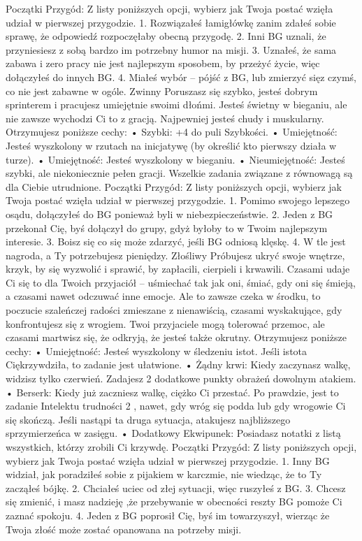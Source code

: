 Początki Przygód: Z listy poniższych opcji, wybierz jak Twoja postać wzięła udział w pierwszej przygodzie.
1. Rozwiązałeś łamigłówkę zanim zdałeś sobie sprawę, że odpowiedź rozpoczęłaby obecną przygodę.
2. Inni BG uznali, że przyniesiesz z sobą bardzo im potrzebny humor na misji.
3. Uznałeś, że sama zabawa i zero pracy nie jest najlepszym sposobem, by przeżyć życie, więc dołączyłeś do innych BG.
4. Miałeś wybór – pójść z BG, lub zmierzyć sięz czymś, co nie jest zabawne w ogóle. 
Zwinny
Poruszasz się szybko, jesteś dobrym sprinterem i pracujesz umiejętnie swoimi dłońmi. Jesteś świetny w bieganiu, ale nie zawsze wychodzi Ci to z gracją. Najpewniej jesteś chudy i muskularny.
Otrzymujesz poniższe cechy:
    • Szybki: +4 do puli Szybkości.
    • Umiejętność: Jesteś wyszkolony w rzutach na inicjatywę (by określić kto pierwszy działa w turze).
    • Umiejętność: Jesteś wyszkolony w bieganiu.
    • Nieumiejętność: Jesteś szybki, ale niekoniecznie pełen gracji. Wszelkie zadania związane z równowagą są dla Ciebie utrudnione. 
Początki Przygód: Z listy poniższych opcji, wybierz jak Twoja postać wzięła udział w pierwszej przygodzie.
1. Pomimo swojego lepszego osądu, dołączyłeś do BG ponieważ byli w niebezpieczeństwie. 
2. Jeden z BG przekonał Cię, byś dołączył do grupy, gdyż byłoby to w Twoim najlepszym interesie.
3. Boisz się co się może zdarzyć, jeśli BG odniosą klęskę.
4. W tle jest nagroda, a Ty potrzebujesz pieniędzy.
Złośliwy
Próbujesz ukryć swoje wnętrze, krzyk, by się wyzwolić i sprawić, by zapłacili, cierpieli i krwawili. Czasami udaje Ci się to dla Twoich przyjaciół – uśmiechać tak jak oni, śmiać, gdy oni się śmieją, a czasami nawet odczuwać inne emocje. Ale to zawsze czeka w środku, to poczucie szaleńczej radości zmieszane z nienawiścią, czasami wyskakujące, gdy konfrontujesz się z wrogiem. Twoi przyjaciele mogą tolerować przemoc, ale czasami martwisz się, że odkryją, że jesteś także okrutny.
Otrzymujesz poniższe cechy:
    • Umiejętność: Jesteś wyszkolony w śledzeniu istot. Jeśli istota Ciękrzywdziła, to zadanie jest ułatwione.
    • Żądny krwi: Kiedy zaczynasz walkę, widzisz tylko czerwień. Zadajesz 2 dodatkowe punkty obrażeń dowolnym atakiem. 
    • Berserk: Kiedy już zaczniesz walkę, ciężko Ci przestać. Po prawdzie, jest to zadanie Intelektu trudności 2 , nawet, gdy wróg się podda lub gdy wrogowie Ci się skończą. Jeśli nastąpi ta druga sytuacja, atakujesz najbliższego sprzymierzeńca w zasięgu.
    • Dodatkowy Ekwipunek: Posiadasz notatki z listą wszystkich, którzy zrobili Ci krzywdę.
Początki Przygód: Z listy poniższych opcji, wybierz jak Twoja postać wzięła udział w pierwszej przygodzie.
1. Inny BG widział, jak poradziłeś sobie z pijakiem w karczmie, nie wiedząc, że to Ty zacząłeś bójkę.
2. Chciałeś uciec od złej sytuacji, więc ruszyłeś z BG.
3. Chcesz się zmienić, i masz nadzieję ,że przebywanie w obecności reszty BG pomoże Ci zaznać spokoju.
4. Jeden z BG poprosił Cię, byś im towarzyszył, wierząc że Twoja złość może zostać opanowana na potrzeby misji.